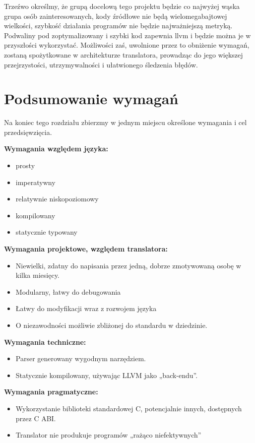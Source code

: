 Trzeźwo określmy, że grupą docelową tego projektu będzie co najwyżej wąska grupa osób zainteresowanych, kody źródłowe nie będą wielomegabajtowej wielkości, szybkość działania programów nie będzie najważniejszą metryką. Podwaliny pod zoptymalizowany i szybki kod zapewnia llvm i będzie można je w przyszłości wykorzystać. Możliwości zaś, uwolnione przez to obniżenie wymagań, zostaną spożytkowane w architekturze translatora, prowadząc do jego większej przejrzystości, utrzymywalności i ułatwionego śledzenia błędów.


\section{Podsumowanie wymagań}
Na koniec tego rozdziału zbierzmy w jednym miejscu określone wymagania i cel przedsięwzięcia.

\textbf{Wymagania względem języka:}
\begin{itemize}[noitemsep]
    \item prosty
    \item imperatywny
    \item relatywnie niskopoziomowy
    \item kompilowany
    \item statycznie typowany
\end{itemize}

\textbf{Wymagania projektowe, względem translatora:}
\begin{itemize}[noitemsep]
    \item Niewielki, zdatny do napisania przez jedną, dobrze zmotywowaną osobę w kilka miesięcy.
    \item Modularny, łatwy do debugowania
    \item Łatwy do modyfikacji wraz z rozwojem języka
    \item O niezawodności możliwie zbliżonej do standardu w dziedzinie.
\end{itemize}

\textbf{Wymagania techniczne:}
\begin{itemize}[noitemsep]
    \item Parser generowany wygodnym narzędziem.
    \item Statycznie kompilowany, używając LLVM jako „back-endu”.
\end{itemize}

\textbf{Wymagania pragmatyczne:}
\begin{itemize}[noitemsep]
    \item Wykorzystanie biblioteki standardowej C, potencjalnie innych, dostępnych przez C ABI.
    \item Translator nie produkuje programów „rażąco niefektywnych”
\end{itemize}